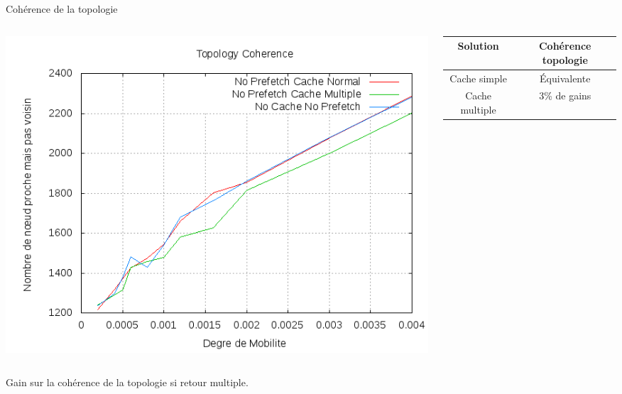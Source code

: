 \documentclass{beamer}
\begin{document}
  \begin{frame}
        \begin{center}
        Cohérence de la topologie
        \end{center}
        \begin{columns}
         \begin{column}{5cm}
          \includegraphics[scale=0.25]{./Ressources/Images/Courbes_Final_Rapport/Topology_Coherence_Caches.png}\\
         \end{column}
         \begin{column}{5cm}
	\footnotesize{
         \begin{table}[!h]
                \begin{center}
                \begin{tabular}{|c|c|}
                \hline
                Solution & Cohérence topologie \\
                \hline
                Cache simple & Équivalente \\
                Cache multiple & 3\% de gains \\
                \hline
                \end{tabular}
                \end{center}
        \end{table}}
         \end{column}
        \end{columns}
        \begin{itemize}\footnotesize{
                \item Gain sur la cohérence de la topologie si retour multiple.
        }
        \end{itemize}
  \end{frame}
	
\end{document}
